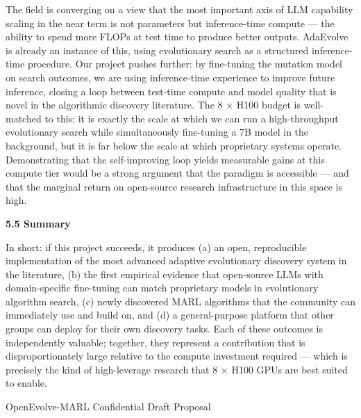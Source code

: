 The field is converging on a view that the most important axis of LLM
capability scaling in the near term is not parameters but inference-time
compute --- the ability to spend more FLOPs at test time to produce
better outputs. AdaEvolve is already an instance of this, using
evolutionary search as a structured inference-time procedure. Our
project pushes further: by fine-tuning the mutation model on search
outcomes, we are using inference-time experience to improve future
inference, closing a loop between test-time compute and model quality
that is novel in the algorithmic discovery literature. The 8 × H100
budget is well-matched to this: it is exactly the scale at which we can
run a high-throughput evolutionary search while simultaneously
fine-tuning a 7B model in the background, but it is far below the scale
at which proprietary systems operate. Demonstrating that the
self-improving loop yields measurable gains at this compute tier would
be a strong argument that the paradigm is accessible --- and that the
marginal return on open-source research infrastructure in this space is
high.

\textbf{5.5 Summary}

In short: if this project succeeds, it produces (a) an open,
reproducible implementation of the most advanced adaptive evolutionary
discovery system in the literature, (b) the first empirical evidence
that open-source LLMs with domain-specific fine-tuning can match
proprietary models in evolutionary algorithm search, (c) newly
discovered MARL algorithms that the community can immediately use and
build on, and (d) a general-purpose platform that other groups can
deploy for their own discovery tasks. Each of these outcomes is
independently valuable; together, they represent a contribution that is
disproportionately large relative to the compute investment required ---
which is precisely the kind of high-leverage research that 8 × H100 GPUs
are best suited to enable.

OpenEvolve-MARL \textbar{} Confidential Draft Proposal
